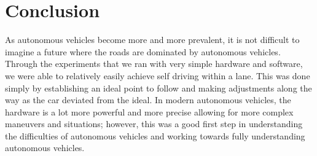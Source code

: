 \documentclass{article}
\begin{document}
\section{Conclusion}
\vspace{-.3cm}
As autonomous vehicles become more and more prevalent, it is not difficult to imagine
a future where the roads are dominated by autonomous vehicles. Through the experiments
that we ran with very simple hardware and software, we were able to relatively easily
achieve self driving within a lane. This was done simply by establishing an ideal point
to follow and making adjustments along the way as the car deviated from the ideal. In modern
autonomous vehicles, the hardware is a lot more powerful and more precise allowing for more
complex maneuvers and situations; however, this was a good first step in understanding
the difficulties of autonomous vehicles and working towards fully understanding autonomous
vehicles.


{\scriptsize%

}
\end{document}
